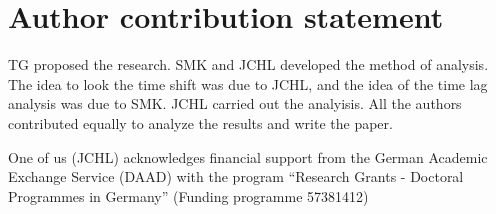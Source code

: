 \section{Author contribution statement}

TG proposed the research. SMK and JCHL developed the method of analysis.
The idea to look the time shift was due to JCHL, and the idea of the time lag
analysis was due to SMK. JCHL carried out the analyisis. All the authors
contributed equally to analyze the results and write the paper.

\begin{acknowledgement}
    One of us (JCHL) acknowledges financial support from the German
    Academic Exchange Service (DAAD) with
    the program ``Research Grants - Doctoral Programmes in Germany''
    (Funding programme 57381412)
\end{acknowledgement}
